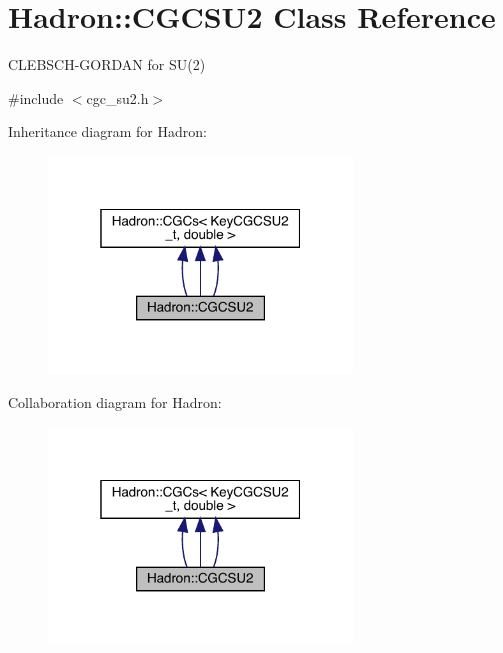 \hypertarget{classHadron_1_1CGCSU2}{}\section{Hadron\+:\+:C\+G\+C\+S\+U2 Class Reference}
\label{classHadron_1_1CGCSU2}


C\+L\+E\+B\+S\+C\+H-\/\+G\+O\+R\+D\+AN for S\+U(2)  




{\ttfamily \#include $<$cgc\+\_\+su2.\+h$>$}



Inheritance diagram for Hadron\+:
\nopagebreak
\begin{figure}[H]
\begin{center}
\leavevmode
\includegraphics[width=229pt]{d1/d43/classHadron_1_1CGCSU2__inherit__graph}
\end{center}
\end{figure}


Collaboration diagram for Hadron\+:
\nopagebreak
\begin{figure}[H]
\begin{center}
\leavevmode
\includegraphics[width=229pt]{d7/da0/classHadron_1_1CGCSU2__coll__graph}
\end{center}
\end{figure}
